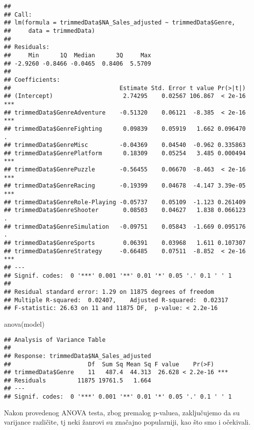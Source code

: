 \documentclass[
]{article}
\newenvironment{Shaded}{\begin{snugshade}}{\end{snugshade}}
\newcommand{\FunctionTok}[1]{\textcolor[rgb]{0.00,0.00,0.00}{#1}}
\newcommand{\NormalTok}[1]{#1}
\begin{document}
\begin{verbatim}
## 
## Call:
## lm(formula = trimmedData$NA_Sales_adjusted ~ trimmedData$Genre, 
##     data = trimmedData)
## 
## Residuals:
##     Min      1Q  Median      3Q     Max 
## -2.9260 -0.8466 -0.0465  0.8406  5.5709 
## 
## Coefficients:
##                               Estimate Std. Error t value Pr(>|t|)    
## (Intercept)                    2.74295    0.02567 106.867  < 2e-16 ***
## trimmedData$GenreAdventure    -0.51320    0.06121  -8.385  < 2e-16 ***
## trimmedData$GenreFighting      0.09839    0.05919   1.662 0.096470 .  
## trimmedData$GenreMisc         -0.04369    0.04540  -0.962 0.335863    
## trimmedData$GenrePlatform      0.18309    0.05254   3.485 0.000494 ***
## trimmedData$GenrePuzzle       -0.56455    0.06670  -8.463  < 2e-16 ***
## trimmedData$GenreRacing       -0.19399    0.04678  -4.147 3.39e-05 ***
## trimmedData$GenreRole-Playing -0.05737    0.05109  -1.123 0.261409    
## trimmedData$GenreShooter       0.08503    0.04627   1.838 0.066123 .  
## trimmedData$GenreSimulation   -0.09751    0.05843  -1.669 0.095176 .  
## trimmedData$GenreSports        0.06391    0.03968   1.611 0.107307    
## trimmedData$GenreStrategy     -0.66485    0.07511  -8.852  < 2e-16 ***
## ---
## Signif. codes:  0 '***' 0.001 '**' 0.01 '*' 0.05 '.' 0.1 ' ' 1
## 
## Residual standard error: 1.29 on 11875 degrees of freedom
## Multiple R-squared:  0.02407,    Adjusted R-squared:  0.02317 
## F-statistic: 26.63 on 11 and 11875 DF,  p-value: < 2.2e-16
\end{verbatim}

\begin{Shaded}
\begin{Highlighting}[]
\FunctionTok{anova}\NormalTok{(model)}
\end{Highlighting}
\end{Shaded}

\begin{verbatim}
## Analysis of Variance Table
## 
## Response: trimmedData$NA_Sales_adjusted
##                      Df  Sum Sq Mean Sq F value    Pr(>F)    
## trimmedData$Genre    11   487.4  44.313  26.628 < 2.2e-16 ***
## Residuals         11875 19761.5   1.664                      
## ---
## Signif. codes:  0 '***' 0.001 '**' 0.01 '*' 0.05 '.' 0.1 ' ' 1
\end{verbatim}

Nakon provedenog ANOVA testa, zbog premalog p-valuea, zaključujemo da su
varijance različite, tj neki žanrovi su značajno popularniji, kao što
smo i očekivali.
\end{document}
